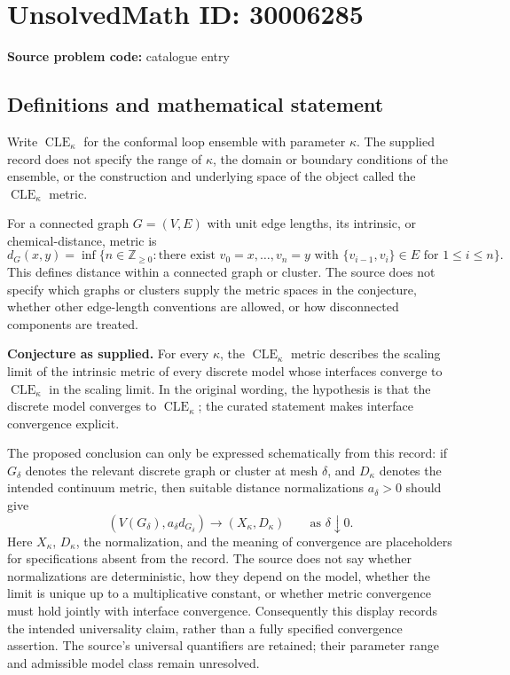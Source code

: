 \documentclass[11pt]{article}
\newcommand{\Z}{\mathbb{Z}}
\begin{document}
\section*{UnsolvedMath ID: 30006285}
\textbf{Source problem code:} catalogue entry
\subsection{Definitions and mathematical statement}
Write \(\operatorname{CLE}_{\kappa}\) for the conformal loop ensemble with parameter \(\kappa\). The supplied record does not specify the range of \(\kappa\), the domain or boundary conditions of the ensemble, or the construction and underlying space of the object called the \(\operatorname{CLE}_{\kappa}\) metric.

For a connected graph \(G=(V,E)\) with unit edge lengths, its intrinsic, or chemical-distance, metric is
\[
 d_G(x,y)=\inf\bigl\{n\in\Z_{\geq 0}:\text{there exist }v_0=x,\ldots,v_n=y\text{ with }\{v_{i-1},v_i\}\in E\text{ for }1\leq i\leq n\bigr\}.
\]
This defines distance within a connected graph or cluster. The source does not specify which graphs or clusters supply the metric spaces in the conjecture, whether other edge-length conventions are allowed, or how disconnected components are treated.

\textbf{Conjecture as supplied.} For every \(\kappa\), the \(\operatorname{CLE}_{\kappa}\) metric describes the scaling limit of the intrinsic metric of every discrete model whose interfaces converge to \(\operatorname{CLE}_{\kappa}\) in the scaling limit. In the original wording, the hypothesis is that the discrete model converges to \(\operatorname{CLE}_{\kappa}\); the curated statement makes interface convergence explicit.

The proposed conclusion can only be expressed schematically from this record: if \(G_\delta\) denotes the relevant discrete graph or cluster at mesh \(\delta\), and \(D_\kappa\) denotes the intended continuum metric, then suitable distance normalizations \(a_\delta>0\) should give
\[
 (V(G_\delta),a_\delta d_{G_\delta})\longrightarrow (X_\kappa,D_\kappa)
 \qquad\text{as }\delta\downarrow 0.
\]
Here \(X_\kappa\), \(D_\kappa\), the normalization, and the meaning of convergence are placeholders for specifications absent from the record. The source does not say whether normalizations are deterministic, how they depend on the model, whether the limit is unique up to a multiplicative constant, or whether metric convergence must hold jointly with interface convergence. Consequently this display records the intended universality claim, rather than a fully specified convergence assertion. The source's universal quantifiers are retained; their parameter range and admissible model class remain unresolved.
\end{document}
